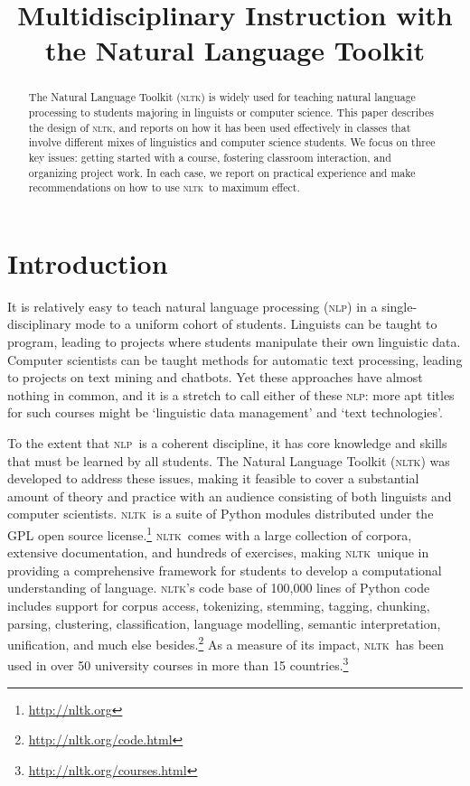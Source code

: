\documentclass[11pt]{article}
\title{Multidisciplinary Instruction with the Natural Language Toolkit}
\author{}
\date{}
\newcommand{\NLP}{\textsc{nlp}}
\newcommand{\NLTK}{\textsc{nltk}}
\begin{document}
\maketitle
\begin{abstract}
  The Natural Language Toolkit (\NLTK) is widely used for teaching
  natural language processing to students majoring in linguists or
  computer science.  This paper describes the design of \NLTK, and
  reports on how it has been used effectively in classes that involve
  different mixes of
  linguistics and computer science students.  We focus
  on three key issues: getting started with a course, fostering
  classroom interaction, and organizing project work.
  In each case, we report on practical experience and make
  recommendations on how to use \NLTK\ to maximum effect.
\end{abstract}

\section{Introduction}

It is relatively easy to teach natural language processing (\NLP) in a
single-disciplinary mode to a uniform cohort of students.  Linguists
can be taught to program, leading to projects where students
manipulate their own linguistic data.  Computer scientists can be
taught methods for automatic text processing, leading to projects on
text mining and chatbots.  Yet these approaches have almost nothing in
common, and it is a stretch to call either of these \NLP: more apt
titles for such courses might be `linguistic data management' and
`text technologies'.

To the extent that \NLP\ is a coherent discipline, it has core knowledge
and skills that must be learned by all students.
The Natural Language Toolkit (\NLTK) was developed to address
these issues, making it feasible to cover a substantial amount of
theory and practice with an audience consisting
of both linguists and computer scientists.
\NLTK\ is a suite of Python modules
distributed under the GPL open source license.\footnote{\url{http://nltk.org}}
\NLTK\ comes with a large collection of corpora, extensive
documentation, and hundreds of exercises, making
\NLTK\ unique in providing a comprehensive framework for
students to develop a computational understanding of language.
\NLTK's code base of 100,000 lines of Python code includes
support for corpus access, tokenizing, stemming, tagging, chunking,
parsing, clustering, classification, language modelling, semantic
interpretation, unification, and much else besides.\footnote{\url{http://nltk.org/code.html}}
As a measure of its impact,
\NLTK\ has been used in over 50 university courses in more than 15
countries.\footnote{\url{http://nltk.org/courses.html}}
\end{document}
